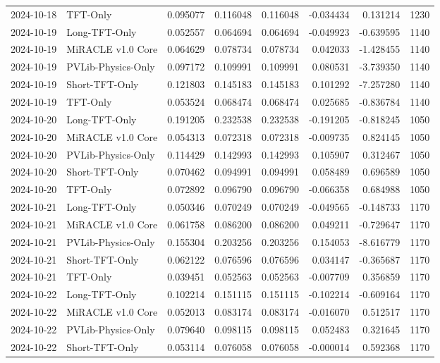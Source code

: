 \begin{tabular}{llrrrrrr}
2024-10-18 & TFT-Only & 0.095077 & 0.116048 & 0.116048 & -0.034434 & 0.131214 & 1230 \\
2024-10-19 & Long-TFT-Only & 0.052557 & 0.064694 & 0.064694 & -0.049923 & -0.639595 & 1140 \\
2024-10-19 & MiRACLE v1.0 Core & 0.064629 & 0.078734 & 0.078734 & 0.042033 & -1.428455 & 1140 \\
2024-10-19 & PVLib-Physics-Only & 0.097172 & 0.109991 & 0.109991 & 0.080531 & -3.739350 & 1140 \\
2024-10-19 & Short-TFT-Only & 0.121803 & 0.145183 & 0.145183 & 0.101292 & -7.257280 & 1140 \\
2024-10-19 & TFT-Only & 0.053524 & 0.068474 & 0.068474 & 0.025685 & -0.836784 & 1140 \\
2024-10-20 & Long-TFT-Only & 0.191205 & 0.232538 & 0.232538 & -0.191205 & -0.818245 & 1050 \\
2024-10-20 & MiRACLE v1.0 Core & 0.054313 & 0.072318 & 0.072318 & -0.009735 & 0.824145 & 1050 \\
2024-10-20 & PVLib-Physics-Only & 0.114429 & 0.142993 & 0.142993 & 0.105907 & 0.312467 & 1050 \\
2024-10-20 & Short-TFT-Only & 0.070462 & 0.094991 & 0.094991 & 0.058489 & 0.696589 & 1050 \\
2024-10-20 & TFT-Only & 0.072892 & 0.096790 & 0.096790 & -0.066358 & 0.684988 & 1050 \\
2024-10-21 & Long-TFT-Only & 0.050346 & 0.070249 & 0.070249 & -0.049565 & -0.148733 & 1170 \\
2024-10-21 & MiRACLE v1.0 Core & 0.061758 & 0.086200 & 0.086200 & 0.049211 & -0.729647 & 1170 \\
2024-10-21 & PVLib-Physics-Only & 0.155304 & 0.203256 & 0.203256 & 0.154053 & -8.616779 & 1170 \\
2024-10-21 & Short-TFT-Only & 0.062122 & 0.076596 & 0.076596 & 0.034147 & -0.365687 & 1170 \\
2024-10-21 & TFT-Only & 0.039451 & 0.052563 & 0.052563 & -0.007709 & 0.356859 & 1170 \\
2024-10-22 & Long-TFT-Only & 0.102214 & 0.151115 & 0.151115 & -0.102214 & -0.609164 & 1170 \\
2024-10-22 & MiRACLE v1.0 Core & 0.052013 & 0.083174 & 0.083174 & -0.016070 & 0.512517 & 1170 \\
2024-10-22 & PVLib-Physics-Only & 0.079640 & 0.098115 & 0.098115 & 0.052483 & 0.321645 & 1170 \\
2024-10-22 & Short-TFT-Only & 0.053114 & 0.076058 & 0.076058 & -0.000014 & 0.592368 & 1170 \\

\end{tabular}
